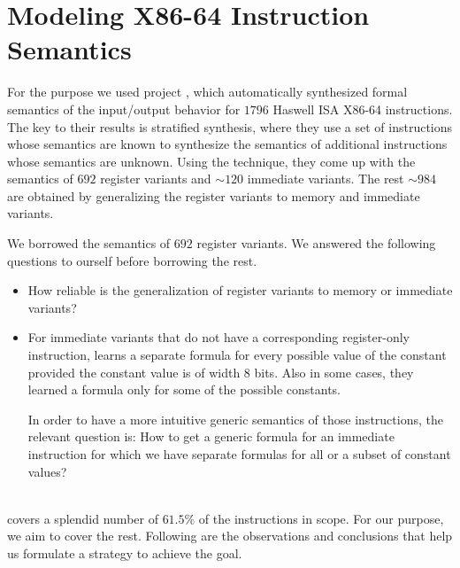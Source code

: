 \section{Modeling X86-64 Instruction Semantics} \label{sec:modelI}

For the purpose we used project \Strata, which automatically synthesized formal semantics  of the input/output behavior for $1796$ Haswell ISA X86-64 instructions. The key to their results is stratified synthesis, where they use a set of instructions whose semantics are known to synthesize the semantics of additional instructions whose semantics are unknown. Using the technique, they 
come up with the semantics of $692$ register variants and $\sim120$ immediate variants. The rest $\sim984$ are obtained by generalizing the register variants to memory and immediate variants.     

We borrowed the semantics of $692$ register variants. We answered the following questions to ourself before borrowing the rest.   

\begin{itemize}
    \item How reliable is the generalization of register variants to memory or immediate variants?   
    
    \item  For immediate  variants that do not have a corresponding register-only instruction, \Strata  learns a separate formula for every possible value of the constant provided the constant value is of width 8 bits. Also in some cases, they learned a formula only for some of the possible constants.
    
    In order to have a more intuitive generic semantics of those instructions, the relevant question is: How to get a generic formula for an immediate instruction for which we have separate formulas for all or a subset of constant values?   
\end{itemize} 
\ \\
\Strata covers a splendid number of $61.5\%$ of the instructions in scope. For our purpose, we aim to cover the rest. Following are the observations and conclusions that help us formulate a strategy to achieve the goal.

